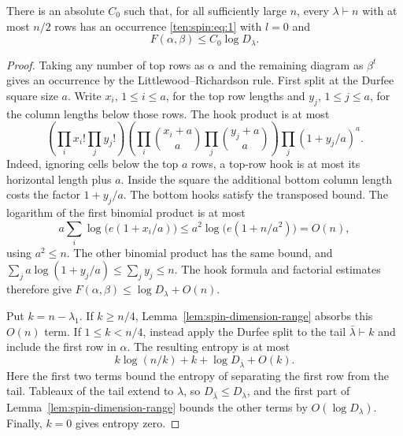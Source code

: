 \begin{lemma}\label{lem:spin-zero-hole}
There is an absolute $C_0$ such that, for all sufficiently large $n$,
every $\lambda\vdash n$ with at most $n/2$ rows has an occurrence
\eqref{ten:spin:eq:1} with $l=0$ and
\begin{equation}
 F(\alpha,\beta)\le C_0\log D_\lambda.
 \label{ten:spin:eq:4}
\end{equation}
\end{lemma}
\begin{proof}
Taking any number of top rows as $\alpha$ and the remaining diagram
as $\beta^t$ gives an occurrence by the Littlewood--Richardson rule.
First split at the Durfee square size $a$. Write $x_i$, $1\le i\le a$,
for the top row lengths and $y_j$, $1\le j\le a$, for the column
lengths below those rows. The hook product is at most
\[
 \left(\prod_i x_i!\prod_j y_j!\right)
 \left(\prod_i\binom{x_i+a}{a}
             \prod_j\binom{y_j+a}{a}\right)
 \prod_j(1+y_j/a)^a.
\]
Indeed, ignoring cells below the top $a$ rows, a top-row hook is
at most its horizontal length plus $a$. Inside the square the
additional bottom column length costs the factor $1+y_j/a$.
The bottom hooks satisfy the transposed bound.
The logarithm of the first binomial product is at most
\[
 a\sum_i\log\bigl(e(1+x_i/a)\bigr)
 \le a^2\log\bigl(e(1+n/a^2)\bigr)=O(n),
\]
using $a^2\le n$. The other binomial product has the same bound, and
$\sum_j a\log(1+y_j/a)\le\sum_jy_j\le n$.
The hook formula and factorial estimates therefore give
$F(\alpha,\beta)\le\log D_\lambda+O(n)$.

Put $k=n-\lambda_1$. If $k\ge n/4$, Lemma~\ref{lem:spin-dimension-range}
absorbs this $O(n)$ term. If $1\le k<n/4$, instead apply the Durfee
split to the tail $\bar\lambda\vdash k$ and include the first row
in $\alpha$. The resulting entropy is at most
\[
 k\log(n/k)+k+\log D_{\bar\lambda}+O(k).
\]
Here the first two terms bound the entropy of separating the first
row from the tail. Tableaux of the tail extend to $\lambda$, so
$D_{\bar\lambda}\le D_\lambda$, and the first part of
Lemma~\ref{lem:spin-dimension-range} bounds the other terms by
$O(\log D_\lambda)$. Finally, $k=0$ gives entropy zero.
\end{proof}

